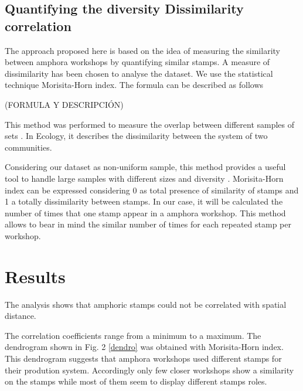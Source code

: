 \documentclass[review]{elsarticle}
\begin{document}
\subsection{Quantifying the diversity Dissimilarity correlation}


The approach proposed here is based on the idea of measuring the similarity between amphora workshops by quantifying similar stamps. A measure of dissimilarity has been chosen to analyse the dataset. We use the statistical technique Morisita-Horn index. The formula can be described as follows

(FORMULA Y DESCRIPCIÓN)


This method was performed to measure the overlap between different samples of sets \citep{morisita_measuring_1959, horn_measurement_1966}. In Ecology, it describes the dissimilarity between the system of two communities. 

Considering our dataset as non-uniform sample, this method provides a useful tool to handle large samples with different sizes and diversity \citep{wolda_similarity_1981}. Morisita-Horn index can be expressed considering 0 as total presence of similarity of stamps and 1 a totally dissimilarity between stamps. In our case, it will be calculated the number of times that one stamp appear in a amphora workshop. This method allows to bear in mind the similar number of times for each repeated stamp per workshop. 


\section{Results}

The analysis shows that amphoric stamps could not be correlated with spatial distance. 

The correlation coefficients range from a minimum to a maximum. The dendrogram shown in Fig. 2 \ref{dendro} was obtained with Morisita-Horn index. This dendrogram suggests that amphora workshops used different stamps for their prodution system. Accordingly only few closer workshops show a similarity on the stamps while most of them seem to display different stamps roles. 
\end{document}
